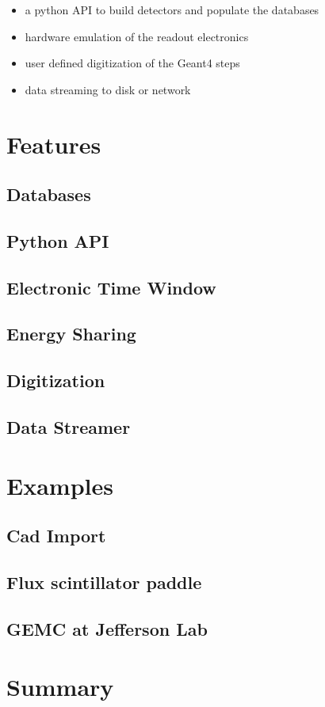 \begin{itemize}
    \item a python API to build detectors and populate the databases
    \item hardware emulation of the readout electronics
    \item user defined digitization of the Geant4 steps
    \item data streaming to disk or network
\end{itemize}


\section{Features}
\label{sec:features}

\subsection{Databases}
\label{subsec:databases}

\subsection{Python API}
\label{subsec:api}

\subsection{Electronic Time Window}
\label{subsec:time_window}

\subsection{Energy Sharing}
\label{subsec:energy_sharing}

\subsection{Digitization}
\label{subsec:digitization}

\subsection{Data Streamer}
\label{subsec:data_streamer}


\section{Examples}
\label{sec:examples}

\subsection{Cad Import}
\label{subsec:cad_import}

\subsection{Flux scintillator paddle}
\label{subsec:flux_scintillator_paddle}

\subsection{GEMC at Jefferson Lab}
\label{subsec:clas12}


\section{Summary}
\label{sec:summary}

